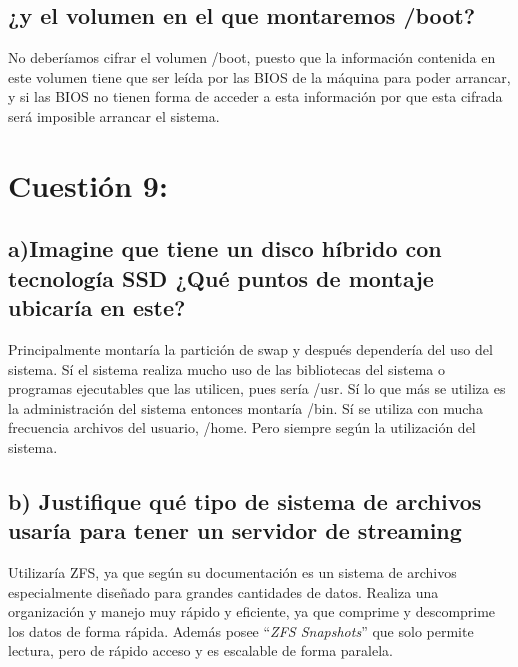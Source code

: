 \subsection{¿y el volumen en el que montaremos /boot?}
No deberíamos cifrar el volumen /boot, puesto que la información contenida en este volumen tiene que ser
leída por las BIOS de la máquina para poder arrancar, y si las BIOS no tienen forma de acceder a esta información
por que esta cifrada será imposible arrancar el sistema.






\section{Cuestión 9:}
\subsection{a)Imagine que tiene un disco híbrido con tecnología SSD ¿Qué puntos de montaje ubicaría en este?}
Principalmente montaría la partición de swap y después dependería del uso del sistema. Sí el sistema realiza mucho 
uso de las bibliotecas del sistema o programas ejecutables que las utilicen, pues sería /usr.
Sí lo que más se utiliza es la administración del sistema entonces montaría /bin.
Sí se utiliza con mucha frecuencia archivos del usuario, /home.
Pero siempre según la utilización del sistema.


\subsection{b) Justifique qué tipo de sistema de archivos usaría para tener un servidor de streaming}
Utilizaría ZFS, ya que según su documentación \cite{ZFS} es un sistema de archivos especialmente diseñado para grandes cantidades de datos.
Realiza una organización y manejo muy rápido y eficiente, ya que  comprime y descomprime los datos de forma rápida. 
Además posee ``\textit{ZFS Snapshots}'' que solo permite lectura, pero de rápido acceso y es escalable de forma paralela.



